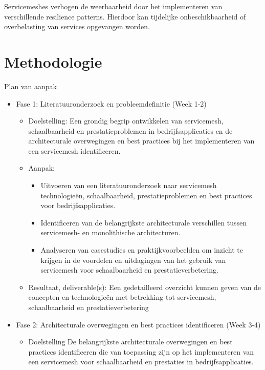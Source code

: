 \documentclass{hogent-article}
\begin{document}
Servicemeshes verhogen de weerbaarheid door het implementeren van verschillende resilience patterns. Hierdoor kan tijdelijke onbeschikbaarheid of overbelasting van services opgevangen worden.

\section{Methodologie}%
\label{sec:methodologie}

Plan van aanpak
\begin{itemize}

    \item Fase 1: Literatuuronderzoek en probleemdefinitie (Week 1-2)
    \begin{itemize}
        \item Doelstelling: Een grondig begrip ontwikkelen van servicemesh, schaalbaarheid en prestatieproblemen in bedrijfsapplicaties en de architecturale overwegingen en best practices bij het implementeren van een servicemesh identificeren.
        \item Aanpak:
        \begin{itemize}
            \item Uitvoeren van een literatuuronderzoek naar servicemesh technologieën, schaalbaarheid, prestatieproblemen en best practices voor bedrijfsapplicaties.
            \item Identificeren van de belangrijkste architecturale verschillen tussen \linebreak servicemesh- en monolithische architecturen.
            \item Analyseren van casestudies en praktijkvoorbeelden om inzicht te krijgen in de voordelen en uitdagingen van het gebruik van servicemesh voor schaalbaarheid en prestatieverbetering.
        \end{itemize}        
        \item Resultaat, deliverable(s): Een gedetailleerd overzicht kunnen geven van de concepten en technologieën met betrekking tot servicemesh, schaalbaarheid en prestatieverbetering
    \end{itemize}            
    \item Fase 2: Architecturale overwegingen en best practices identificeren (Week 3-4)
    \begin{itemize}
        \item Doelstelling De belangrijkste architecturale overwegingen en best practices identificeren die van toepassing zijn op het implementeren van een servicemesh voor schaalbaarheid en prestaties in bedrijfsapplicaties.

\end{itemize}
\end{itemize}
\end{document}
